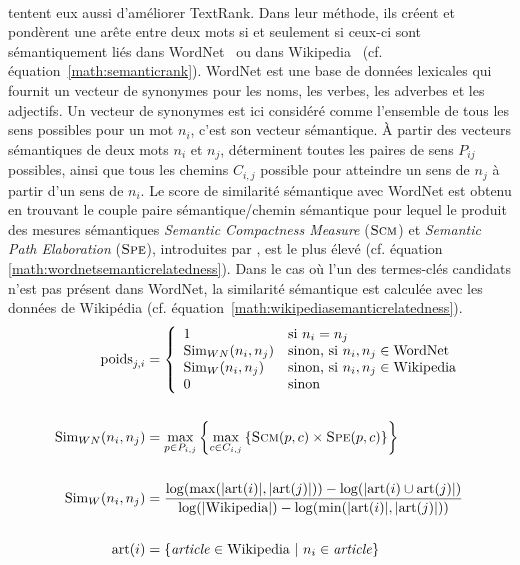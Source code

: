         ~\\ tentent eux aussi d'améliorer
        TextRank. Dans leur méthode, ils créent et pondèrent une arête entre
        deux mots si et seulement si ceux-ci sont sémantiquement liés dans
        WordNet~\cite{miller1995wordnet} ou dans
        Wikipedia~\cite{milne2008wikipediasemanticrelatedness} (cf.
        équation~\ref{math:semanticrank}). WordNet est une base de données
        lexicales qui fournit un vecteur de synonymes pour les noms, les verbes,
        les adverbes et les adjectifs. Un vecteur de synonymes est ici considéré
        comme l'ensemble de tous les sens possibles pour un mot $n_i$, c'est son
        vecteur sémantique. À partir des vecteurs sémantiques de deux mots $n_i$
        et $n_j$,  déterminent toutes les
        paires de sens $P_{ij}$ possibles, ainsi que tous les chemins $C_{i, j}$
        possible pour atteindre un sens de $n_j$ à partir d'un sens de $n_i$. Le
        score de similarité sémantique avec WordNet est obtenu en trouvant le
        couple paire sémantique/chemin sémantique pour lequel le produit des
        mesures sémantiques \textit{Semantic Compactness Measure}
        ($\textsc{Scm}$) et \textit{Semantic Path Elaboration} ($\textsc{Spe}$),
        introduites par , est le plus
        élevé (cf. équation \ref{math:wordnetsemanticrelatedness}). Dans le cas
        où l'un des termes-clés candidats n'est pas présent dans WordNet, la
        similarité sémantique est calculée avec les données de Wikipédia (cf.
        équation~\ref{math:wikipediasemanticrelatedness}).
        \begin{align}
          \text{poids}_{j, i} &= \left\{\begin{array}{ll}
            1 & \text{si $n_i = n_j$}\\
            \text{Sim}_{WN}(n_i, n_j) & \text{sinon, si $n_i, n_j \in \text{WordNet}$}\\
             \text{Sim}_{W}(n_i, n_j) &  \text{sinon, si $n_i, n_j \in \text{Wikipedia}$}\\
            0 & \text{sinon}
          \end{array}\right. \label{math:semanticrank}\\
          \notag\\
          \text{Sim}_{WN}(n_i, n_j) &= \max_{p \in P_{i, j}}\left\{\max_{c \in C_{i, j}}\left\{\textsc{Scm}(p, c) \times \textsc{Spe}(p, c)\right\}\right\} \label{math:wordnetsemanticrelatedness}\\
          \notag\\
          \text{Sim}_{W}(n_i, n_j) &= \frac{\log(\max(|\text{art}(i)|, |\text{art}(j)|)) - \log(|\text{art}(i) \cup \text{art}(j)|)}{\log(|\text{Wikipedia}|) - \log(\min(|\text{art}(i)|, |\text{art}(j)|))} \label{math:wikipediasemanticrelatedness}\\
          \notag\\
          \text{art}(i) &= \left\{\text{\textit{article}} \in \text{Wikipedia}\ |\ n_i \in \text{\textit{article}}\right\} \notag
        \end{align}

